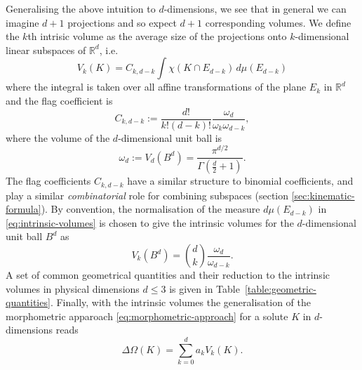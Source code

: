 Generalising the above intuition to $d$-dimensions, we see that in general we can imagine $d+1$ projections and so expect $d+1$ corresponding volumes.
We define the $k$th intrisic volume as the average size of the projections onto $k$-dimensional linear subspaces of $\mathbb{R}^d$, i.e.\
\begin{equation}\label{eq:intrinsic-volumes}
  V_k(K)
  =
  C_{k,d-k}
  \int \chi(K \cap E_{d-k}) \, d\mu(E_{d-k})
\end{equation}
where the integral is taken over all affine transformations of the plane $E_k$ in $\mathbb{R}^d$ and the flag coefficient is
\begin{equation}\label{eq:flag-coefficients}
  C_{k,d-k}
  :=
  \frac{d!}{k! (d-k)!} \frac{\omega_d}{\omega_k \omega_{d-k}},
\end{equation}
where the volume of the $d$-dimensional unit ball is
\begin{equation}
  \omega_d := V_d(B^d) = \frac{\pi^{d/2}}{\Gamma(\frac{d}{2} + 1)}.
\end{equation}
The flag coefficients $C_{k,d-k}$ have a similar structure to binomial coefficients, and play a similar \emph{combinatorial} role for combining subspaces (section \ref{sec:kinematic-formula}).
By convention, the normalisation of the measure $d\mu(E_{d-k})$ in \eqref{eq:intrinsic-volumes} is chosen to give the intrinsic volumes for the $d$-dimensional unit ball $B^d$ as
\begin{equation}\label{eq:intrinsic-volume-ball}
  V_k (B^d)
  =
  {d \choose k} \frac{\omega_d}{\omega_{d-k}}.
\end{equation}
A set of common geometrical quantities and their reduction to the intrinsic volumes in physical dimensions $d \le 3$ is given in Table~\ref{table:geometric-quantities}.
Finally, with the intrinsic volumes the generalisation of the morphometric apparoach \eqref{eq:morphometric-approach} for a solute $K$ in $d$-dimensions reads
\begin{equation}\label{eq:morphometric-approach-d}
  \Delta \Omega(K)
  =
  \sum_{k=0}^d a_k V_k(K).
\end{equation}

